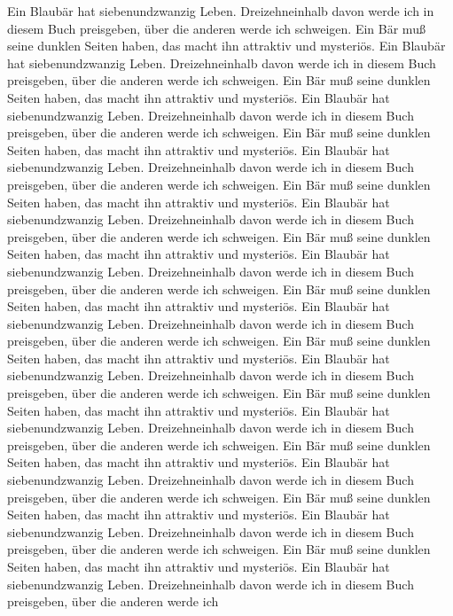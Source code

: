 \documentclass[a4paper,10pt]{article}
\begin{document}
Ein Blaub\"ar hat siebenundzwanzig Leben.
Dreizehneinhalb davon werde ich in diesem
Buch preisgeben, \"uber die anderen werde ich
schweigen. Ein B\"ar mu\ss{} seine dunklen
Seiten haben, das macht ihn attraktiv und
mysteri\"os.
Ein Blaub\"ar hat siebenundzwanzig Leben.
Dreizehneinhalb davon werde ich in diesem
Buch preisgeben, \"uber die anderen werde ich
schweigen. Ein B\"ar mu\ss{} seine dunklen
Seiten haben, das macht ihn attraktiv und
mysteri\"os.
Ein Blaub\"ar hat siebenundzwanzig Leben.
Dreizehneinhalb davon werde ich in diesem
Buch preisgeben, \"uber die anderen werde ich
schweigen. Ein B\"ar mu\ss{} seine dunklen
Seiten haben, das macht ihn attraktiv und
mysteri\"os.
Ein Blaub\"ar hat siebenundzwanzig Leben.
Dreizehneinhalb davon werde ich in diesem
Buch preisgeben, \"uber die anderen werde ich
schweigen. Ein B\"ar mu\ss{} seine dunklen
Seiten haben, das macht ihn attraktiv und
mysteri\"os.
Ein Blaub\"ar hat siebenundzwanzig Leben.
Dreizehneinhalb davon werde ich in diesem
Buch preisgeben, \"uber die anderen werde ich
schweigen. Ein B\"ar mu\ss{} seine dunklen
Seiten haben, das macht ihn attraktiv und
mysteri\"os.
Ein Blaub\"ar hat siebenundzwanzig Leben.
Dreizehneinhalb davon werde ich in diesem
Buch preisgeben, \"uber die anderen werde ich
schweigen. Ein B\"ar mu\ss{} seine dunklen
Seiten haben, das macht ihn attraktiv und
mysteri\"os.
Ein Blaub\"ar hat siebenundzwanzig Leben.
Dreizehneinhalb davon werde ich in diesem
Buch preisgeben, \"uber die anderen werde ich
schweigen. Ein B\"ar mu\ss{} seine dunklen
Seiten haben, das macht ihn attraktiv und
mysteri\"os.
Ein Blaub\"ar hat siebenundzwanzig Leben.
Dreizehneinhalb davon werde ich in diesem
Buch preisgeben, \"uber die anderen werde ich
schweigen. Ein B\"ar mu\ss{} seine dunklen
Seiten haben, das macht ihn attraktiv und
mysteri\"os.
Ein Blaub\"ar hat siebenundzwanzig Leben.
Dreizehneinhalb davon werde ich in diesem
Buch preisgeben, \"uber die anderen werde ich
schweigen. Ein B\"ar mu\ss{} seine dunklen
Seiten haben, das macht ihn attraktiv und
mysteri\"os.
Ein Blaub\"ar hat siebenundzwanzig Leben.
Dreizehneinhalb davon werde ich in diesem
Buch preisgeben, \"uber die anderen werde ich
schweigen. Ein B\"ar mu\ss{} seine dunklen
Seiten haben, das macht ihn attraktiv und
mysteri\"os.
Ein Blaub\"ar hat siebenundzwanzig Leben.
Dreizehneinhalb davon werde ich in diesem
Buch preisgeben, \"uber die anderen werde ich
schweigen. Ein B\"ar mu\ss{} seine dunklen
Seiten haben, das macht ihn attraktiv und
mysteri\"os.
Ein Blaub\"ar hat siebenundzwanzig Leben.
Dreizehneinhalb davon werde ich in diesem
Buch preisgeben, \"uber die anderen werde ich
\end{document}

